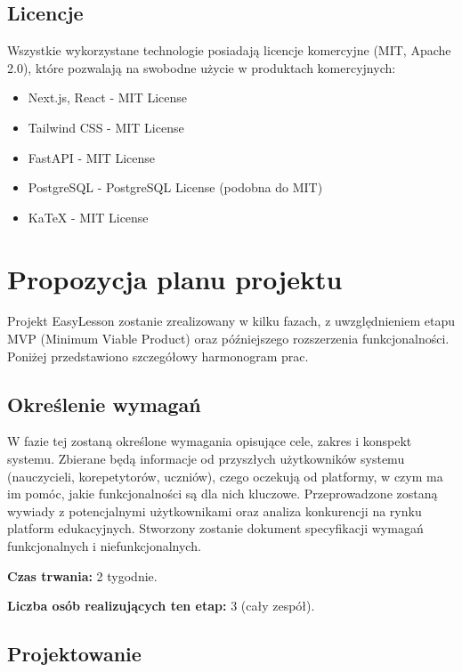 \documentclass[12pt,a4paper]{article}
\begin{document}
\subsection{Licencje}

Wszystkie wykorzystane technologie posiadają licencje komercyjne (MIT, Apache 2.0), które pozwalają na swobodne użycie w produktach komercyjnych:

\begin{itemize}[leftmargin=*]
    \item Next.js, React - MIT License
    \item Tailwind CSS - MIT License
    \item FastAPI - MIT License
    \item PostgreSQL - PostgreSQL License (podobna do MIT)
    \item KaTeX - MIT License
\end{itemize}


\section{Propozycja planu projektu}

Projekt EasyLesson zostanie zrealizowany w kilku fazach, z uwzględnieniem etapu MVP (Minimum Viable Product) oraz późniejszego rozszerzenia funkcjonalności. Poniżej przedstawiono szczegółowy harmonogram prac.

\subsection{Określenie wymagań}

W fazie tej zostaną określone wymagania opisujące cele, zakres i konspekt systemu. Zbierane będą informacje od przyszłych użytkowników systemu (nauczycieli, korepetytorów, uczniów), czego oczekują od platformy, w czym ma im pomóc, jakie funkcjonalności są dla nich kluczowe. Przeprowadzone zostaną wywiady z potencjalnymi użytkownikami oraz analiza konkurencji na rynku platform edukacyjnych. Stworzony zostanie dokument specyfikacji wymagań funkcjonalnych i niefunkcjonalnych.

\textbf{Czas trwania:} 2 tygodnie.

\textbf{Liczba osób realizujących ten etap:} 3 (cały zespół).

\subsection{Projektowanie}
\end{document}
